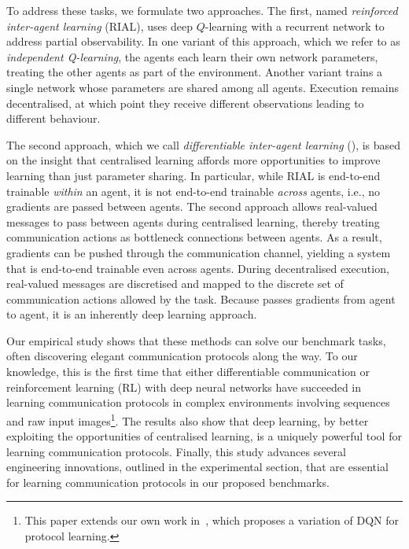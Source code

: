 To address these tasks, we formulate two approaches.  The first, named \emph{reinforced inter-agent  learning} (RIAL), uses deep $Q$-learning \cite{Mnih:2015} with a recurrent network to address partial observability. In one variant of this approach, which we refer to as  \emph{independent Q-learning}, the agents each learn their own network parameters, treating the other agents as part of the environment. Another variant trains a single network whose parameters are shared among all agents. Execution remains decentralised, at which point they receive different observations leading to different behaviour.

The second approach, which we call \emph{differentiable inter-agent  learning} (\dic), is based on the insight that centralised learning affords more opportunities to improve learning than just parameter sharing.  In particular, while RIAL is end-to-end trainable \emph{within} an agent, it is not end-to-end trainable \emph{across} agents, i.e., no gradients are passed between agents.  The second approach allows real-valued messages to pass between agents during centralised learning, thereby treating communication actions as bottleneck connections between agents.  As a result, gradients can be pushed through the communication channel, yielding a system that is end-to-end trainable even across agents.  During decentralised execution, real-valued messages are discretised and mapped to the discrete set of communication actions allowed by the task.  Because \dic passes gradients from agent to agent, it is an inherently deep learning approach.

Our empirical study shows that these methods can solve our benchmark tasks, often discovering elegant communication protocols along the way. To our knowledge, this is the first time that either differentiable communication or reinforcement learning (RL) with deep neural networks 
have succeeded in learning communication protocols in complex environments involving sequences and raw input images\footnote{This paper extends our own work in~\cite{foerster2016learning}, which proposes a variation of DQN for protocol learning.}. The results also show that deep learning, by better exploiting the opportunities of centralised learning, is a uniquely powerful tool for learning communication protocols. Finally, this study advances several engineering innovations, outlined in the experimental section, that are essential for learning communication protocols in our proposed benchmarks.

